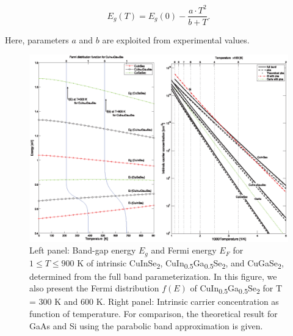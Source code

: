 \documentclass[a4paper, 12pt, titlepage,oneside,drop]{kthesis}
\begin{document}
\begin{equation}\label{bgtd}
 E_g(T) = E_g(0) - \frac{a \cdot T^2}{b+T}.
\end{equation}

Here, parameters $a$ and $b$ are exploited from experimental values.

\begin{table}[H]
\centering
 \captionsetup{width=1\textwidth}
\caption {Parameters of $a$ and $b$ in \textbf{Eq. \ref{bgtd}}}\label{chen2}
\end{table}


 \begin{figure}[H]
    \begin{center}
            \includegraphics[width=1\textwidth,clip]{JAP4}
     \end{center}
    \caption{Left panel: Band-gap energy $E_g$ and Fermi energy $E_F$ for $1 \leq T \leq 900$ K of intrinsic CuInSe\textsubscript{2}, CuIn\textsubscript{0.5}Ga\textsubscript{0.5}Se\textsubscript{2}, and CuGaSe\textsubscript{2},
    determined from the full band parameterization. In this figure, we also present the Fermi distribution $f(E)$ of CuIn\textsubscript{0.5}Ga\textsubscript{0.5}Se\textsubscript{2} for T = 300 K and 600 K. Right panel: 
    Intrinsic carrier concentration as function of temperature. For comparison, the theoretical result for GaAs and Si using the parabolic band approximation is given.}
   \label{icc}
\end{figure}
\end{document}
